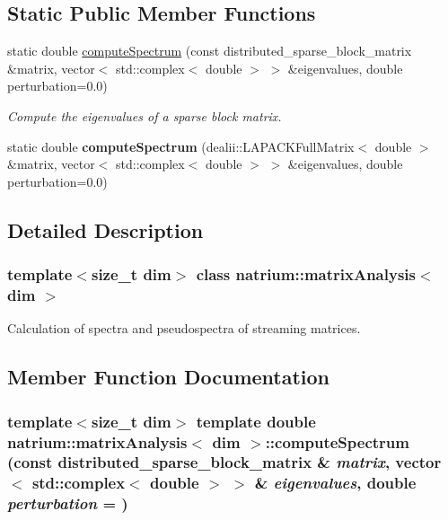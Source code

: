 \subsection*{Static Public Member Functions}
\begin{DoxyCompactItemize}
\item 
static double \hyperlink{classnatrium_1_1matrixAnalysis_a03a05223c2dc32a674f8b3ec2f6e6659}{computeSpectrum} (const distributed\_\-sparse\_\-block\_\-matrix \&matrix, vector$<$ std::complex$<$ double $>$ $>$ \&eigenvalues, double perturbation=0.0)
\begin{DoxyCompactList}\small\item\em Compute the eigenvalues of a sparse block matrix. \item\end{DoxyCompactList}\item 
\hypertarget{classnatrium_1_1matrixAnalysis_a964e7ba2af5b8f105b82d4ce56f314da}{
static double {\bfseries computeSpectrum} (dealii::LAPACKFullMatrix$<$ double $>$ \&matrix, vector$<$ std::complex$<$ double $>$ $>$ \&eigenvalues, double perturbation=0.0)}
\label{classnatrium_1_1matrixAnalysis_a964e7ba2af5b8f105b82d4ce56f314da}

\end{DoxyCompactItemize}


\subsection{Detailed Description}
\subsubsection*{template$<$size\_\-t dim$>$ class natrium::matrixAnalysis$<$ dim $>$}

Calculation of spectra and pseudospectra of streaming matrices. 

\subsection{Member Function Documentation}
\hypertarget{classnatrium_1_1matrixAnalysis_a03a05223c2dc32a674f8b3ec2f6e6659}{
\subsubsection[{computeSpectrum}]{\setlength{\rightskip}{0pt plus 5cm}template$<$size\_\-t dim$>$ template double {\bf natrium::matrixAnalysis}$<$ dim $>$::computeSpectrum (const distributed\_\-sparse\_\-block\_\-matrix \& {\em matrix}, \/  vector$<$ std::complex$<$ double $>$ $>$ \& {\em eigenvalues}, \/  double {\em perturbation} = {})}}
\label{classnatrium_1_1matrixAnalysis_a03a05223c2dc32a674f8b3ec2f6e6659}


